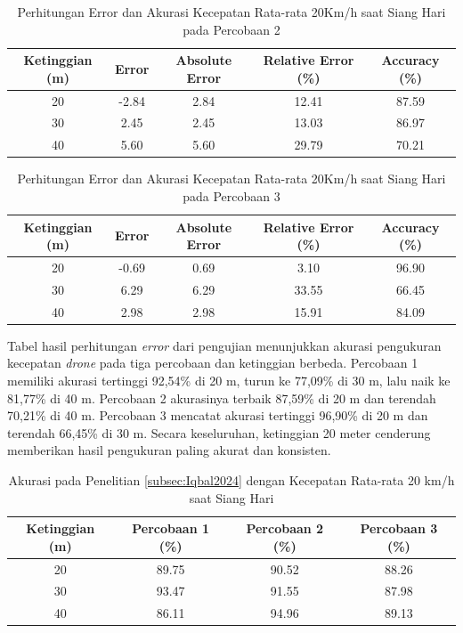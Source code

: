 \begin{table}[H]
\centering
\caption{Perhitungan Error dan Akurasi Kecepatan Rata-rata 20Km/h saat Siang Hari pada Percobaan 2}
\label{table:error_accuracy_titik2}
\begin{tabular}{|c|c|c|c|c|}
\hline
\textbf{Ketinggian (m)} & \textbf{Error} & \textbf{Absolute Error} & \textbf{Relative Error (\%)} & \textbf{Accuracy (\%)} \\ \hline
20 & -2.84 & 2.84 & 12.41 & 87.59 \\
30 & 2.45 & 2.45 & 13.03 & 86.97 \\
40 & 5.60 & 5.60 & 29.79 & 70.21 \\ \hline
\end{tabular}
\end{table}

\begin{table}[H]
\centering
\caption{Perhitungan Error dan Akurasi Kecepatan Rata-rata 20Km/h saat Siang Hari pada Percobaan 3}
\label{table:error_accuracy_titik3}
\begin{tabular}{|c|c|c|c|c|}
\hline
\textbf{Ketinggian (m)} & \textbf{Error} & \textbf{Absolute Error} & \textbf{Relative Error (\%)} & \textbf{Accuracy (\%)} \\ \hline
20 & -0.69 & 0.69 & 3.10 & 96.90 \\
30 & 6.29 & 6.29 & 33.55 & 66.45 \\
40 & 2.98 & 2.98 & 15.91 & 84.09 \\ \hline
\end{tabular}
\end{table}
Tabel hasil perhitungan \emph{error} dari pengujian menunjukkan akurasi pengukuran kecepatan \emph{drone} pada tiga percobaan dan ketinggian berbeda. Percobaan 1 memiliki akurasi tertinggi 92,54\% di 20 m, turun ke 77,09\% di 30 m, lalu naik ke 81,77\% di 40 m. Percobaan 2 akurasinya terbaik 87,59\% di 20 m dan terendah 70,21\% di 40 m. Percobaan 3 mencatat akurasi tertinggi 96,90\% di 20 m dan terendah 66,45\% di 30 m. Secara keseluruhan, ketinggian 20 meter cenderung memberikan hasil pengukuran paling akurat dan konsisten.

\begin{table}[H]
\centering
\caption{Akurasi pada Penelitian \ref{subsec:Iqbal2024} dengan Kecepatan Rata-rata 20 km/h saat Siang Hari}
\label{table:accuracy_iqbal}
\begin{tabular}{|c|c|c|c|}
\hline
\textbf{Ketinggian (m)} & \textbf{Percobaan 1 (\%)} & \textbf{Percobaan 2 (\%)} & \textbf{Percobaan 3 (\%)} \\ \hline
20 & 89.75 & 90.52 & 88.26 \\
30 & 93.47 & 91.55 & 87.98 \\
40 & 86.11 & 94.96 & 89.13 \\ \hline
\end{tabular}
\end{table}

